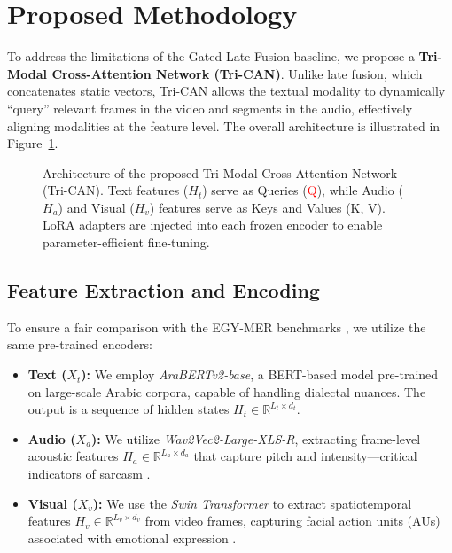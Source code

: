 \documentclass[12pt, a4paper]{article}
\begin{document}

\section{Proposed Methodology}\label{sec:methodology}

To address the limitations of the Gated Late Fusion baseline, we propose a \textbf{Tri-Modal Cross-Attention Network (Tri-CAN)}. Unlike late fusion, which concatenates static vectors, Tri-CAN allows the textual modality to dynamically ``query'' relevant frames in the video and segments in the audio, effectively aligning modalities at the feature level. The overall architecture is illustrated in Figure~\ref{fig:trican}.

\begin{figure}[ht]
\centering

\caption{Architecture of the proposed Tri-Modal Cross-Attention Network (Tri-CAN). Text features ($H_t$) serve as Queries (\textcolor{red}{Q}), while Audio ($H_a$) and Visual ($H_v$) features serve as Keys and Values (\textcolor{cyan!70!black}{K, V}). LoRA adapters are injected into each frozen encoder to enable parameter-efficient fine-tuning.}
\label{fig:trican}
\end{figure}

\subsection{Feature Extraction and Encoding}
To ensure a fair comparison with the EGY-MER benchmarks \citep{Hussein2025}, we utilize the same pre-trained encoders:
\begin{itemize}
    \item \textbf{Text ($X_t$):} We employ \textit{AraBERTv2-base}, a BERT-based model pre-trained on large-scale Arabic corpora, capable of handling dialectal nuances. The output is a sequence of hidden states $H_t \in \mathbb{R}^{L_t \times d_t}$.
    \item \textbf{Audio ($X_a$):} We utilize \textit{Wav2Vec2-Large-XLS-R}, extracting frame-level acoustic features $H_a \in \mathbb{R}^{L_a \times d_a}$ that capture pitch and intensity---critical indicators of sarcasm \citep{Hussien2018}.
    \item \textbf{Visual ($X_v$):} We use the \textit{Swin Transformer} to extract spatiotemporal features $H_v \in \mathbb{R}^{L_v \times d_v}$ from video frames, capturing facial action units (AUs) associated with emotional expression \citep{Hussein2025}.
\end{itemize}
\end{document}
